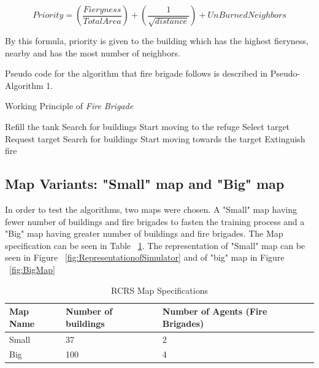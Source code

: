 \documentclass[12pt]{report}
\begin{document}
\[ Priority = (\frac{Fieryness}{Total Area}) + (\frac{1}{\sqrt{distance}}) + {UnBurnedNeighbors}  \]

By this formula, priority is given to the building which has the highest fieryness, nearby and has the most number of neighbors.

Pseudo code for the algorithm that fire brigade follows is described in Pseudo-Algorithm 1.

\begin{algorithm}
\caption{Working Principle of \emph{Fire Brigade}}
\begin{algorithmic}

\STATE  Refill the tank
\ENDIF 
{}
\STATE Search for buildings
\ENDIF
{}
\STATE Start moving to the refuge
\ENDIF
{}
\STATE Select target
\STATE Request target
\ELSE 
\STATE  Search for buildings 
\ENDIF 
\ENDIF
{}
\STATE Start moving towards the target
\ENDIF
{}
\STATE Extinguish fire
\ENDIF
\end{algorithmic}
\end{algorithm}

\subsection{Map Variants: "Small" map and "Big" map} \label{RCRSEnvironment}


In order to test the algorithms, two maps were chosen. A "Small" map having fewer number of buildings and fire brigades to fasten the training process and a "Big" map having greater number of buildings and fire brigades. The Map specification can be seen in Table ~\ref{table:RCRSMapSpecs}. The representation of "Small" map can be seen in Figure ~\ref{fig:RepresentationofSimulator} and of "big" map in Figure ~\ref{fig:BigMap}

\begin{table} [!h]
\begin{center}
 \begin{tabular}{l | l | l} 
 \hline
 Map Name & Number of buildings & Number of Agents (Fire Brigades)  \\ [0.5ex] 
 \hline\hline
 Small & 37 & 2\\
 Big & 100 & 4\\
 \hline
\end{tabular}
\caption{RCRS Map Specifications}
\label{table:RCRSMapSpecs}
\end{center}
\end{table}
\end{document}
